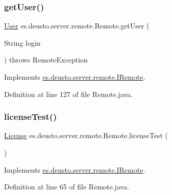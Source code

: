 \subsubsection{\texorpdfstring{get\+User()}{getUser()}}
{\footnotesize\ttfamily \hyperlink{classes_1_1deusto_1_1server_1_1db_1_1data_1_1_user}{User} es.\+deusto.\+server.\+remote.\+Remote.\+get\+User (\begin{DoxyParamCaption}\item[{String}]{login }\end{DoxyParamCaption}) throws Remote\+Exception}



Implements \hyperlink{interfacees_1_1deusto_1_1server_1_1remote_1_1_i_remote_a011f0eb1977e978bddb8ef1a385221ed}{es.\+deusto.\+server.\+remote.\+I\+Remote}.



Definition at line 127 of file Remote.\+java.

\mbox{\label{classes_1_1deusto_1_1server_1_1remote_1_1_remote_a58e6d2180aeea8259ea29392ffe70b8b}} 
\subsubsection{\texorpdfstring{license\+Test()}{licenseTest()}}
{\footnotesize\ttfamily \hyperlink{classes_1_1deusto_1_1server_1_1db_1_1data_1_1_license}{License} es.\+deusto.\+server.\+remote.\+Remote.\+license\+Test (\begin{DoxyParamCaption}{ }\end{DoxyParamCaption})}



Implements \hyperlink{interfacees_1_1deusto_1_1server_1_1remote_1_1_i_remote_a58d270fcac4cf9bc4ccd7fb45dd92753}{es.\+deusto.\+server.\+remote.\+I\+Remote}.



Definition at line 65 of file Remote.\+java.

\mbox{\label{classes_1_1deusto_1_1server_1_1remote_1_1_remote_a5a130e99a06078d7d6fe186597e91d41}} 

